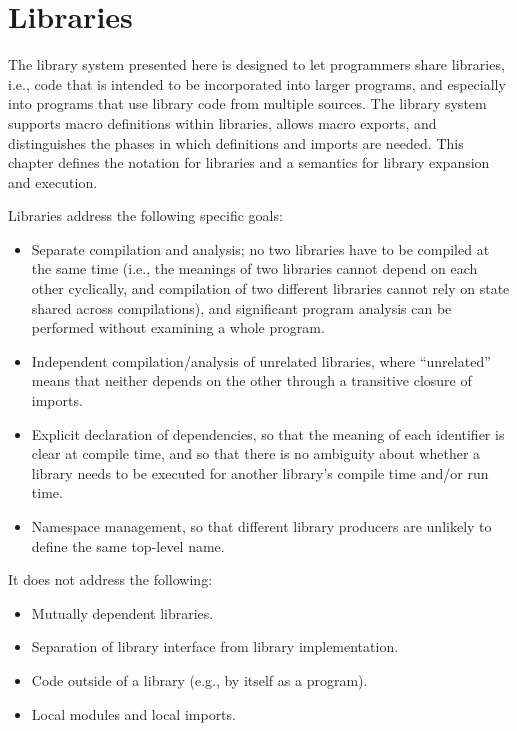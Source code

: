 \chapter{Libraries}
\label{librarychapter}
The library system presented here is designed to let programmers share
libraries, i.e., code that is intended to be incorporated into larger
programs, and especially into programs that use library code from multiple
sources.  The library system supports macro definitions within libraries,
allows macro exports, and distinguishes the phases in which definitions
and imports are needed.  This chapter defines the notation for
libraries and a semantics for library expansion and execution.

Libraries address the following specific goals:

\begin{itemize}
\item Separate compilation and analysis; no two libraries have to be
  compiled at the same time (i.e., the meanings of two libraries
  cannot depend on each other cyclically, and compilation of two
  different libraries cannot rely on state shared across
  compilations), and significant program analysis
  can be performed without examining a whole program.
\item Independent compilation/analysis of unrelated libraries, where
  ``unrelated'' means that neither depends on the other through a
  transitive closure of imports.
\item Explicit declaration of dependencies, so that the meaning of
  each identifier is clear at compile time, and so that there is no
  ambiguity about whether a library needs to be executed for another
  library's compile time and/or run time.
\item Namespace management, so that different library producers are
  unlikely to define the same top-level name.
\end{itemize}

It does not address the following:

\begin{itemize}
\item Mutually dependent libraries.
\item Separation of library interface from library implementation.
\item Code outside of a library (e.g., {} by itself as a program).
\item Local modules and local imports. 
\end{itemize}

